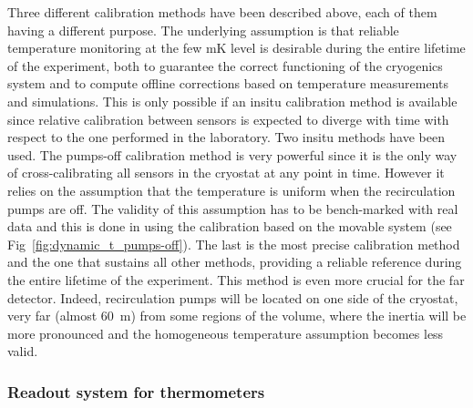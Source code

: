 
Three different calibration methods have been described above, each of them having a different purpose. The underlying assumption is that reliable temperature monitoring at the few mK level is desirable during the entire lifetime of the experiment, both to guarantee the correct functioning of the cryogenics system and to compute offline corrections based on temperature measurements and  simulations. This is only possible if an insitu calibration method is available since relative calibration between sensors is expected to diverge with time with respect to the one performed in the laboratory. Two insitu methods have been used. The pumps-off calibration method is very powerful since it is the only way of cross-calibrating all sensors in the cryostat at any point in time. However it relies on the assumption that the temperature is uniform when the recirculation pumps are off. The validity of this assumption has to be bench-marked with real data and this is done in  using the calibration based on the movable system (see Fig~\ref{fig:dynamic_t_pumps-off}). The last is the most precise calibration method and the one that sustains all other methods, providing a reliable reference during the entire lifetime of the experiment. This method is even more crucial for the far detector. Indeed, recirculation pumps will be located on one side of the cryostat, very far (almost \SI{60}{m}) from some regions of the  volume, where the inertia will be more pronounced and the homogeneous temperature assumption becomes less valid.   

\subsubsection{Readout system for thermometers}
\label{sec:fdgen-slow-cryo-therm-readout}


